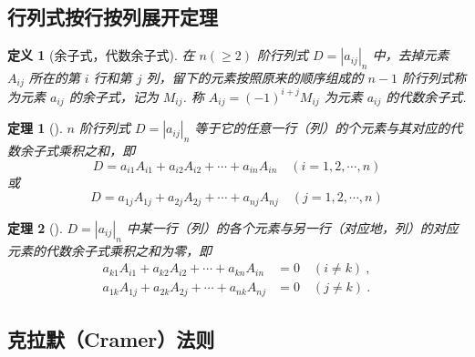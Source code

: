 \documentclass[zihao=-4,UTF8,linespread=1.8,nothm]{aytony_base}
\newtheorem{theorem}{\indent 定理}[subsection]
\newtheorem{definition}{\indent 定义}[subsection]
\begin{document}
\subsection{行列式按行按列展开定理}

\begin{definition}[余子式，代数余子式]
    在 $n(\geqslant 2)$ 阶行列式 $D = |a_{ij}|_n$ 中，去掉元素 $A_{ij} $ 所在的第 $i$ 行和第 $j$ 列，留下的元素按照原来的顺序组成的 $n-1$ 阶行列式称为元素 $a_{ij}$ 的余子式，记为 $M_{ij}$. 称 $A_{ij} = (-1)^{i+j}M_{ij}$ 为元素 $a_{ij}$ 的代数余子式.
\end{definition}

\begin{theorem}[]
    $n$ 阶行列式 $D = |a_{ij}|_n$ 等于它的任意一行（列）的个元素与其对应的代数余子式乘积之和，即 $$
        D = a_{i1}A_{i1} + a_{i2}A_{i2} + \cdots + a_{in}A_{in}\quad(i = 1, 2, \cdots, n)
    $$ 或 $$
        D = a_{1j}A_{1j} + a_{2j}A_{2j} + \cdots + a_{nj}A_{nj}\quad( j= 1, 2, \cdots, n)
    $$
\end{theorem}

\begin{theorem}[]
    $D = |a_{ij}|_n$ 中某一行（列）的各个元素与另一行（对应地，列）的对应元素的代数余子式乘积之和为零，即 $$
        \begin{aligned}
            a_{k1}A_{i1} + a_{k2}A_{i2} + \cdots + a_{kn}A_{in} & = 0\quad(i \neq k)\ , \\
            a_{1k}A_{1j} + a_{2k}A_{2j} + \cdots + a_{nk}A_{nj} & = 0\quad(j \neq k)\ .
        \end{aligned}
    $$
\end{theorem}

\subsection{克拉默（Cramer）法则}
\end{document}
